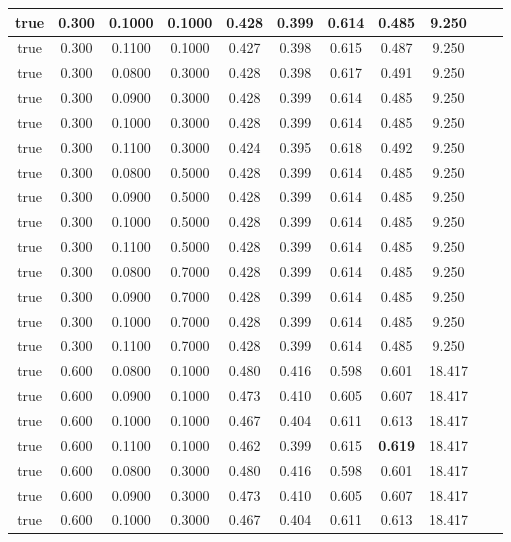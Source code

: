 \documentclass{article}
\begin{document}
\begin{longtable}[c]{|c|c|c|c|c|c|c|c|c|c|c|}
 true & 0.300 & 0.1000 & 0.1000 & 0.428 & 0.399 & 0.614 & 0.485 & 9.250  \\ \hline 
 true & 0.300 & 0.1100 & 0.1000 & 0.427 & 0.398 & 0.615 & 0.487 & 9.250  \\ \hline 
 true & 0.300 & 0.0800 & 0.3000 & 0.428 & 0.398 & 0.617 & 0.491 & 9.250  \\ \hline 
 true & 0.300 & 0.0900 & 0.3000 & 0.428 & 0.399 & 0.614 & 0.485 & 9.250  \\ \hline 
 true & 0.300 & 0.1000 & 0.3000 & 0.428 & 0.399 & 0.614 & 0.485 & 9.250  \\ \hline 
 true & 0.300 & 0.1100 & 0.3000 & 0.424 & 0.395 & 0.618 & 0.492 & 9.250  \\ \hline 
 true & 0.300 & 0.0800 & 0.5000 & 0.428 & 0.399 & 0.614 & 0.485 & 9.250  \\ \hline 
 true & 0.300 & 0.0900 & 0.5000 & 0.428 & 0.399 & 0.614 & 0.485 & 9.250  \\ \hline 
 true & 0.300 & 0.1000 & 0.5000 & 0.428 & 0.399 & 0.614 & 0.485 & 9.250  \\ \hline 
 true & 0.300 & 0.1100 & 0.5000 & 0.428 & 0.399 & 0.614 & 0.485 & 9.250  \\ \hline 
 true & 0.300 & 0.0800 & 0.7000 & 0.428 & 0.399 & 0.614 & 0.485 & 9.250  \\ \hline 
 true & 0.300 & 0.0900 & 0.7000 & 0.428 & 0.399 & 0.614 & 0.485 & 9.250  \\ \hline 
 true & 0.300 & 0.1000 & 0.7000 & 0.428 & 0.399 & 0.614 & 0.485 & 9.250  \\ \hline 
 true & 0.300 & 0.1100 & 0.7000 & 0.428 & 0.399 & 0.614 & 0.485 & 9.250  \\ \hline 
 true & 0.600 & 0.0800 & 0.1000 & 0.480 & 0.416 & 0.598 & 0.601 & 18.417  \\ \hline 
 true & 0.600 & 0.0900 & 0.1000 & 0.473 & 0.410 & 0.605 & 0.607 & 18.417  \\ \hline 
 true & 0.600 & 0.1000 & 0.1000 & 0.467 & 0.404 & 0.611 & 0.613 & 18.417  \\ \hline 
 true & 0.600 & 0.1100 & 0.1000 & 0.462 & 0.399 & 0.615 & \cellcolor{gray!20} \textbf{0.619} & 18.417  \\ \hline 
 true & 0.600 & 0.0800 & 0.3000 & 0.480 & 0.416 & 0.598 & 0.601 & 18.417  \\ \hline 
 true & 0.600 & 0.0900 & 0.3000 & 0.473 & 0.410 & 0.605 & 0.607 & 18.417  \\ \hline 
 true & 0.600 & 0.1000 & 0.3000 & 0.467 & 0.404 & 0.611 & 0.613 & 18.417  \\ \hline 

\end{longtable}
\end{document}
